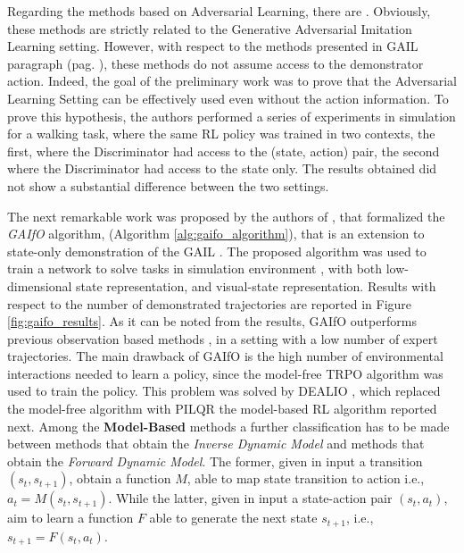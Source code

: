 \newline Regarding the methods based on Adversarial Learning, there are \cite{merel2017learning,torabi2018gaifo}. Obviously, these methods are strictly related to the Generative Adversarial Imitation Learning setting. However, with respect to the methods presented in GAIL paragraph (pag. \pageref{para:gail}), these methods do not assume access to the demonstrator action. Indeed, the goal of the preliminary work \cite{merel2017learning} was to prove that the Adversarial Learning Setting can be effectively used even without the action information. To prove this hypothesis, the authors performed a series of experiments in simulation for a walking task, where the same RL policy was trained in two contexts, the first, where the Discriminator had access to the (state, action) pair, the second where the Discriminator had access to the state only. The results obtained did not show a substantial difference between the two settings. 

\newline The next remarkable work was proposed by the authors of \cite{torabi2018gaifo}, that formalized the \textit{GAIfO} algorithm, (Algorithm \ref{alg:gaifo_algorithm}), that is an extension to state-only demonstration of the GAIL \cite{ho2016gail}. The proposed algorithm was used to train a network to solve tasks in simulation environment \cite{brockman2016openai}, with both low-dimensional state representation, and visual-state representation. Results with respect to the number of demonstrated trajectories are reported in Figure \ref{fig:gaifo_results}.
As it can be noted from the results, GAIfO outperforms previous observation based methods \cite{sermanet2018time_contrastive,torabi2018bco}, in a setting with a low number of expert trajectories. The main drawback of GAIfO is the high number of environmental interactions needed to learn a policy, since the model-free TRPO \cite{schulman2015trpo} algorithm was used to train the policy. This problem was solved by DEALIO \cite{torabi2021dealio}, which replaced the model-free algorithm with PILQR \cite{chebotar2017pilqr} the model-based RL algorithm reported next. 
\noindent Among the \textbf{Model-Based} methods a further classification has to be made between methods that obtain the \textit{Inverse Dynamic Model} and methods that obtain the \textit{Forward Dynamic Model}. The former, given in input a transition $(s_{t}, s_{t+1})$, obtain a function $M$, able to map state transition to action i.e., $a_{t} = M(s_{t}, s_{t+1})$. While the latter, given in input a state-action pair $(s_{t}, a_{t})$, aim to learn a function $F$ able to generate the next state $s_{t+1}$, i.e., $s_{t+1} = F(s_{t}, a_{t})$.
